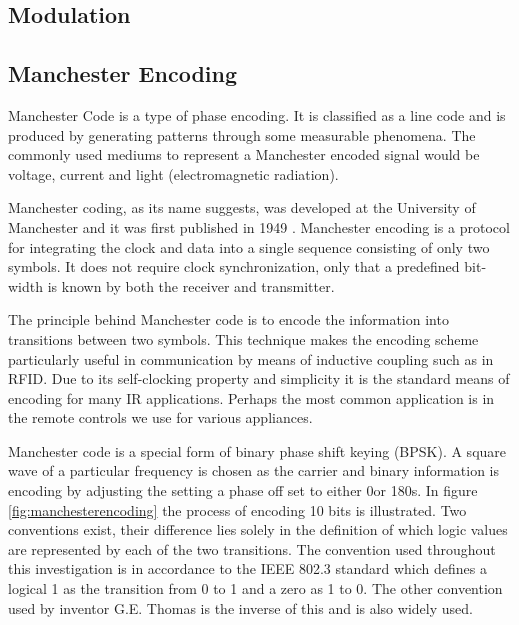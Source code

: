 


\subsection{Modulation}

\subsection{Manchester Encoding}
\label{sec:manchester_encoding}
Manchester Code is a type of phase encoding. It is classified as a line code and is produced by generating patterns through some measurable phenomena. The commonly used mediums to represent a Manchester encoded signal would be voltage, current and light (electromagnetic radiation).

Manchester coding, as its name suggests, was developed at the University of Manchester and it was first published in 1949 \cite{Jameel2019}. Manchester encoding is a protocol for integrating the clock and data into a single sequence consisting of only two symbols. It does not require clock synchronization, only that a predefined bit-width is known by both the receiver and transmitter. 

The principle behind Manchester code is to encode the information into transitions between two symbols. This technique makes the encoding scheme particularly useful in communication by means of inductive coupling such as in RFID. Due to its self-clocking property and simplicity it is the standard means of encoding for many IR applications. Perhaps the most common application is in the remote controls we use for various appliances.

Manchester code is a special form of binary phase shift keying (BPSK). A square wave of a particular frequency is chosen as the carrier and binary information is encoding by adjusting the setting a phase off set to either 0\degree or 180\degree s. In figure \ref{fig:manchesterencoding} the process of encoding 10 bits is illustrated. Two conventions exist, their difference lies solely in the definition of which logic values are represented by each of the two transitions. The convention used throughout this investigation is in accordance to the IEEE 802.3 standard which defines a logical 1 as the transition from 0 to 1 and a zero as 1 to 0. The other convention used by inventor G.E. Thomas is the inverse of this and is also widely used.\\

